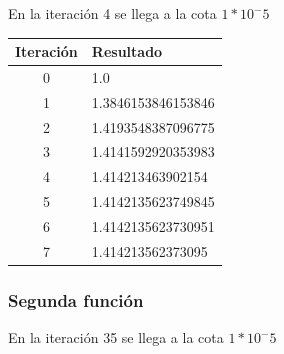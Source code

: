 \documentclass[titlepage,a4paper]{article}
\begin{document}
En la iteración 4 se llega a la cota $1*10^-5$

\begin{center}
    \begin{tabular}{| c | l |}
    \hline
     Iteración & Resultado \\ \hline
     0     &  1.0 \\
    1     &  1.3846153846153846 \\
    2     &  1.4193548387096775 \\
    3     &  1.4141592920353983 \\
    4     &  1.414213463902154 \\
    5     &  1.4142135623749845 \\
    6     &  1.4142135623730951 \\
    7     &  1.414213562373095 \\
    \hline
    \end{tabular}
\end{center}

\subsubsection{Segunda función}\label{sec:sec2}
En la iteración 35 se llega a la cota $1*10^-5$
\end{document}
